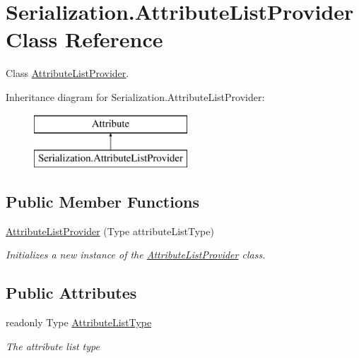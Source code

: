 \hypertarget{class_serialization_1_1_attribute_list_provider}{}\section{Serialization.\+Attribute\+List\+Provider Class Reference}
\label{class_serialization_1_1_attribute_list_provider}


Class \hyperlink{class_serialization_1_1_attribute_list_provider}{Attribute\+List\+Provider}.  


Inheritance diagram for Serialization.\+Attribute\+List\+Provider\+:\begin{figure}[H]
\begin{center}
\leavevmode
\includegraphics[height=2.000000cm]{class_serialization_1_1_attribute_list_provider}
\end{center}
\end{figure}
\subsection*{Public Member Functions}
\begin{DoxyCompactItemize}
\item 
\hyperlink{class_serialization_1_1_attribute_list_provider_a71707014902de0a17f325e2efe18df12}{Attribute\+List\+Provider} (Type attribute\+List\+Type)
\begin{DoxyCompactList}\small\item\em Initializes a new instance of the \hyperlink{class_serialization_1_1_attribute_list_provider}{Attribute\+List\+Provider} class. \end{DoxyCompactList}\end{DoxyCompactItemize}
\subsection*{Public Attributes}
\begin{DoxyCompactItemize}
\item 
readonly Type \hyperlink{class_serialization_1_1_attribute_list_provider_a785b33c0a2e74addd6d14310fbfb5286}{Attribute\+List\+Type}
\begin{DoxyCompactList}\small\item\em The attribute list type \end{DoxyCompactList}\end{DoxyCompactItemize}


